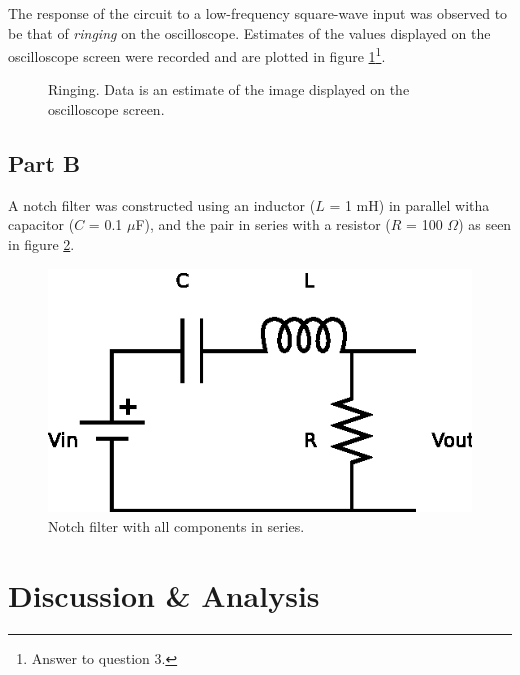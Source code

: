 \documentclass[11pt,onecolumn]{article}
\begin{document}
The response of the circuit to a low-frequency square-wave input was observed to be that of {\em ringing} on the oscilloscope. Estimates of the values displayed on the oscilloscope screen were recorded and are plotted in figure \ref{fig:Ringing}\footnote{Answer to question 3.}.
\begin{figure}
\begin{center}

\end{center}
\caption{Ringing. Data is an estimate of the image displayed on the oscilloscope screen.}\label{fig:Ringing}
\end{figure}

\subsection{Part B}
A notch filter was constructed using an inductor ($L$ = 1 mH) in parallel witha capacitor ($C$ = 0.1 $\mu$F), and the pair in series with a resistor ($R$ = 100 $\Omega$) as seen in figure \ref{fig:Notch_Filter_series}.
\begin{figure}
\begin{center}
\includegraphics{Diagram2.eps}
\end{center}
\caption{Notch filter with all components in series.}\label{fig:Notch_Filter_series}
\end{figure}

\section{Discussion \& Analysis}\label{sec:Discussion}
\end{document}
